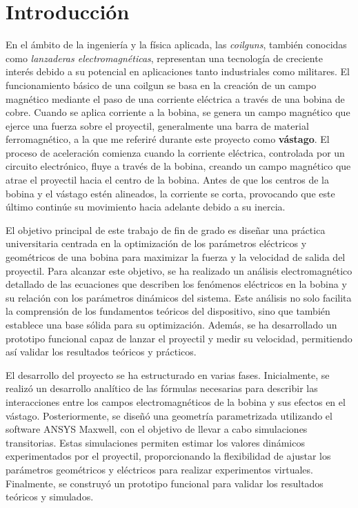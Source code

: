 \section{Introducción}


En el ámbito de la ingeniería y la física aplicada, las \textit{coilguns}, también conocidas como \textit{lanzaderas electromagnéticas}, representan una tecnología de creciente interés debido a su potencial en aplicaciones tanto industriales como militares. El funcionamiento básico de una coilgun se basa en la creación de un campo magnético mediante el paso de una corriente eléctrica a través de una bobina de cobre. Cuando se aplica corriente a la bobina, se genera un campo magnético que ejerce una fuerza sobre el proyectil, generalmente una barra de material ferromagnético, a la que me referiré durante este proyecto como \textbf{vástago}. El proceso de aceleración comienza cuando la corriente eléctrica, controlada por un circuito electrónico, fluye a través de la bobina, creando un campo magnético que atrae el proyectil hacia el centro de la bobina. Antes de que los centros de la bobina y el vástago estén alineados, la corriente se corta, provocando que este último continúe su movimiento hacia adelante debido a su inercia.

El objetivo principal de este trabajo de fin de grado es diseñar una práctica universitaria centrada en la optimización de los parámetros eléctricos y geométricos de una bobina para maximizar la fuerza y la velocidad de salida del proyectil. Para alcanzar este objetivo, se ha realizado un análisis electromagnético detallado de las ecuaciones que describen los fenómenos eléctricos en la bobina y su relación con los parámetros dinámicos del sistema. Este análisis no solo facilita la comprensión de los fundamentos teóricos del dispositivo, sino que también establece una base sólida para su optimización. Además, se ha desarrollado un prototipo funcional capaz de lanzar el proyectil y medir su velocidad, permitiendo así validar los resultados teóricos y prácticos.

El desarrollo del proyecto se ha estructurado en varias fases. Inicialmente, se realizó un desarrollo analítico de las fórmulas necesarias para describir las interacciones entre los campos electromagnéticos de la bobina y sus efectos en el vástago. Posteriormente, se diseñó una geometría parametrizada utilizando el software ANSYS Maxwell, con el objetivo de llevar a cabo simulaciones transitorias. Estas simulaciones permiten estimar los valores dinámicos experimentados por el proyectil, proporcionando la flexibilidad de ajustar los parámetros geométricos y eléctricos para realizar experimentos virtuales. Finalmente, se construyó un prototipo funcional para validar los resultados teóricos y simulados.

